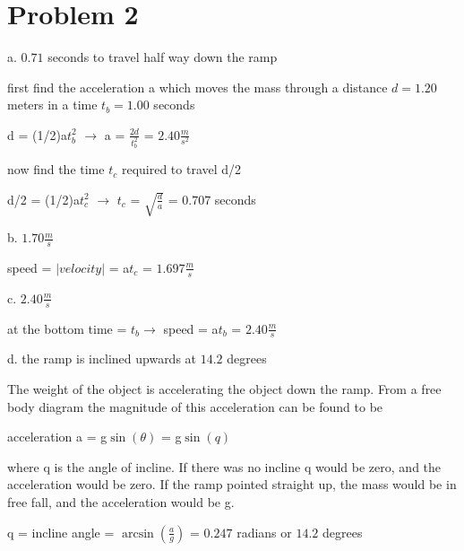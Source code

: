 \chapter{Problem 2}
\label{Problem 2}
a. $0.71$ seconds to travel half way down the ramp

first find the acceleration a which moves the mass through a distance $d = 1.20$
meters in a time $t_{b} = 1.00$ seconds

d = (1/2)a$t_{b}^{2}$ $\rightarrow$ a = $\frac{2d}{t_{b}^{2}}$ = $2.40 \frac{m}{s^{2}}$

now find the time $t_{c}$ required to travel d/2

d/2 = (1/2)a$t_{c}^{2}$ $\rightarrow$ $t_{c}$ = $\sqrt{ \frac{d}a{} }$ = $0.707$ seconds


b. $1.70 \frac{m}{s}$

speed = $|velocity|$ = a$t_{c}$ = $1.697 \frac{m}{s}$

c. $2.40 \frac{m}{s}$

at the bottom time = $t_{b} \rightarrow$ speed = a$t_{b}$ = $2.40 \frac{m}{s}$

d. the ramp is inclined upwards at $14.2$ degrees

The weight of the object is accelerating the object down the ramp.  From a free
body diagram the magnitude of this acceleration can be found to be

acceleration a = g$\sin( \theta )$ = g$\sin(q)$

where q is the angle of incline.  If there was no incline q would be zero, and
the acceleration would be zero.  If the ramp pointed straight up, the mass would be
in free fall, and the acceleration would be g.

q = incline angle = $\arcsin( \frac{a}{g} )$ = $0.247$ radians or $14.2$ degrees
